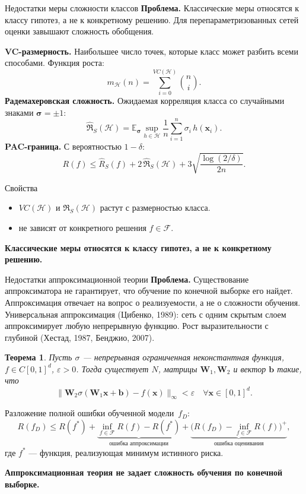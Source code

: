 \documentclass[9pt,pdf,hyperref={unicode}]{beamer}
\newtheorem{rustheorem}{Теорема}
\newcommand{\key}[1]{\par\vspace{0.5ex}\noindent\textbf{\color{darkgreen}#1}}
\begin{document}
\begin{frame}{Недостатки меры сложности классов}
\justifying
\small
\textbf{Проблема.} Классические меры относятся к классу гипотез, а не к конкретному решению. Для перепараметризованных сетей оценки завышают сложность обобщения.

\textbf{VC-размерность.} Наибольшее число точек, которые класс может разбить всеми способами. Функция роста:
\[
    m_{\mathcal{H}}(n)=\sum_{i=0}^{VC(\mathcal{H})}\binom{n}{i}.
\]
\textbf{Радемахеровская сложность.} Ожидаемая корреляция класса со случайными знаками $\boldsymbol{\sigma}=\pm1$:
\[
    \widehat{\mathfrak R}_S(\mathcal{H})=\mathbb{E}_{\boldsymbol{\sigma}}\sup_{h\in\mathcal{H}}\frac{1}{n}\sum_{i=1}^{n}\sigma_i\,h(\mathbf{x}_i).
\]
\textbf{PAC-граница.} С вероятностью $1-\delta$:
\[
    R(f)\le \widehat R_S(f)+2\,\widehat{\mathfrak R}_S(\mathcal{H})+3\sqrt{\frac{\log(2/\delta)}{2n}}.
\]
\begin{block}{Свойства}
\begin{itemize}
    \item $VC(\mathcal{H})$ и $\widehat{\mathfrak R}_S(\mathcal{H})$ растут с размерностью класса.
    \item не зависят от конкретного решения $f\in\mathcal{F}$.
\end{itemize}
\end{block}
\key{Классические меры относятся к классу гипотез, а не к конкретному решению.}
\end{frame}
\begin{frame}{Недостатки аппроксимационной теории}
\justifying
\small
\textbf{Проблема.} Существование аппроксиматора не гарантирует, что обучение по конечной выборке его найдет. Аппроксимация отвечает на вопрос о реализуемости, а не о сложности обучения.
Универсальная аппроксимация (Цибенко, 1989): сеть с одним скрытым слоем аппроксимирует любую непрерывную функцию. Рост выразительности с глубиной (Хестад, 1987, Бенджио, 2007).
\begin{rustheorem}
    Пусть $\sigma$ --- непрерывная ограниченная неконстантная функция, $f\in C[0,1]^d$, $\varepsilon>0$. Тогда существует $N$, матрицы $\mathbf{W}_1,\mathbf{W}_2$ и вектор $\mathbf{b}$ такие, что
    \[
        \bigl\|\mathbf{W}_2\sigma(\mathbf{W}_1\mathbf{x}+\mathbf{b})-f(\mathbf{x})\bigr\|_\infty<\varepsilon\quad\forall\mathbf{x}\in[0,1]^d.
    \]
\end{rustheorem}
Разложение полной ошибки обученной модели~$f_D$:
\[
    R(f_D)\le R(f^*)+\underbrace{\inf_{f\in\mathcal{F}}R(f)-R(f^*)}_{\text{ошибка аппроксимации}}+\underbrace{\bigl(R(f_D)-\inf_{f\in\mathcal{F}}R(f)\bigr)^{+}}_{\text{ошибка оценивания}},
\]
где $f^*$ --- функция, реализующая минимум истинного риска.

\key{Аппроксимационная теория не задает сложность обучения по конечной выборке.}
\end{frame}
\end{document}
